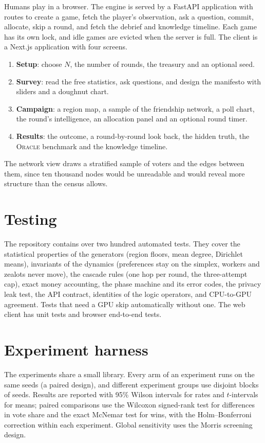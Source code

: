 \documentclass[11pt,a4paper,oneside]{report}
\newcommand{\ORACLE}{\textsc{Oracle}}
\begin{document}
Humans play in a browser. The engine is served by a FastAPI application with routes to
create a game, fetch the player's observation, ask a question, commit, allocate, skip a round, and fetch
the debrief and knowledge timeline. Each game has its own lock, and idle games are evicted when the server
is full. The client is a Next.js application with four screens.
\begin{enumerate}
  \item \textbf{Setup}: choose $N$, the number of rounds, the treasury and an optional seed.
  \item \textbf{Survey}: read the free statistics, ask questions, and design the manifesto with sliders and
        a doughnut chart.
  \item \textbf{Campaign}: a region map, a sample of the friendship network, a poll chart, the round's
        intelligence, an allocation panel and an optional round timer.
  \item \textbf{Results}: the outcome, a round-by-round look back, the hidden truth, the \ORACLE{} benchmark
        and the knowledge timeline.
\end{enumerate}
The network view draws a stratified sample of voters and the edges between them, since ten thousand nodes
would be unreadable and would reveal more structure than the census allows.

\section{Testing}

The repository contains over two hundred automated tests. They cover the statistical properties of the
generators (region floors, mean degree, Dirichlet means), invariants of the dynamics (preferences stay on
the simplex, workers and zealots never move), the cascade rules (one hop per round, the three-attempt
cap), exact money accounting, the phase machine and its error codes, the privacy leak test, the API
contract, identities of the logic operators, and CPU-to-GPU agreement. Tests that need a GPU skip
automatically without one. The web client has unit tests and browser end-to-end tests.

\section{Experiment harness}

The experiments share a small library. Every arm of an experiment runs on the same seeds (a paired
design), and different experiment groups use disjoint blocks of seeds. Results are reported with 95\%
Wilson intervals for rates and $t$-intervals for means; paired comparisons use the
Wilcoxon signed-rank test for differences in vote share and the exact McNemar
test for wins, with the Holm--Bonferroni correction within each
experiment. Global sensitivity uses the Morris screening design.
\end{document}

